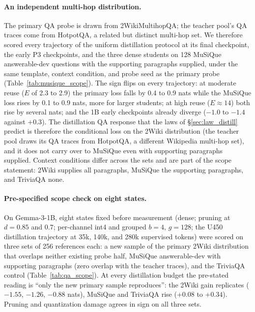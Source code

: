 \paragraph{An independent multi-hop distribution.} The primary QA
probe is drawn from 2WikiMultihopQA; the teacher pool's QA traces come
from HotpotQA, a related but distinct multi-hop set. We therefore scored every trajectory
of the uniform distillation protocol at its final checkpoint, the
early P3 checkpoints, and the three dense students on 128 MuSiQue
answerable-dev questions \citep{trivedi2022musique} with the
supporting paragraphs supplied, under the same template, context
condition, and probe seed as the primary probe
(Table~\ref{tab:musique_scope}). The sign flips on every trajectory:
at moderate reuse ($E$ of 2.3 to 2.9) the primary loss falls by 0.4 to
0.9 nats while the MuSiQue loss rises by 0.1 to 0.9 nats, more for
larger students; at high reuse ($E\approx14$) both rise by several
nats; and the 1B early checkpoints already diverge ($-1.0$ to $-1.4$
against $+0.3$). The distillation QA response that the laws of
\S\ref{sec:law_distill} predict is therefore the conditional loss on
the 2Wiki distribution (the teacher pool draws its QA traces from
HotpotQA, a different Wikipedia multi-hop set), and it does not carry
over to MuSiQue even with supporting paragraphs supplied. Context
conditions differ across the sets and are part of the scope statement:
2Wiki supplies all paragraphs, MuSiQue the supporting paragraphs, and
TriviaQA none.


\paragraph{Pre-specified scope check on eight states.} On Gemma-3-1B,
eight states fixed before measurement (dense; pruning at $d=0.85$ and
$0.7$; per-channel int4 and grouped $b=4$, $g=128$; the U450
distillation trajectory at 35k, 140k, and 280k supervised tokens) were
scored on three sets of 256 references each: a new sample of the
primary 2Wiki distribution that overlaps neither existing probe half,
MuSiQue answerable-dev with supporting paragraphs (zero overlap with
the teacher traces), and the TriviaQA control (Table~\ref{tab:qa_scope}). At
every distillation budget the pre-stated reading is ``only the new
primary sample reproduces'': the 2Wiki gain replicates ($-1.55$,
$-1.26$, $-0.88$ nats), MuSiQue and TriviaQA rise ($+0.08$ to $+0.34$).
Pruning and quantization damage agrees in sign on all three sets.


